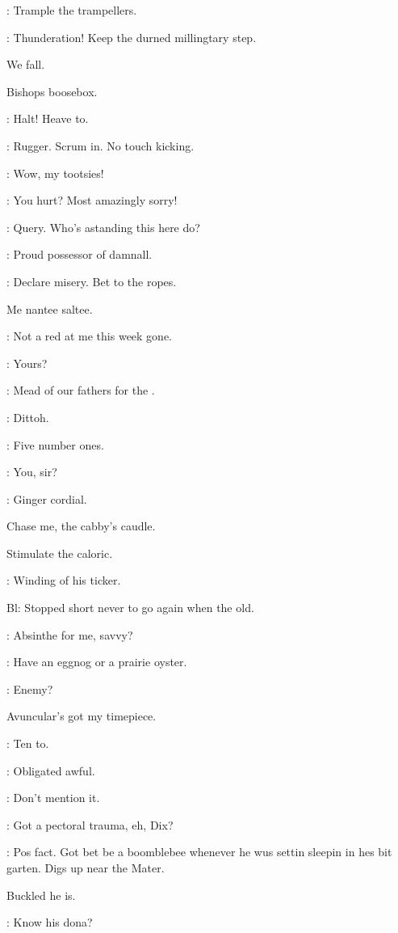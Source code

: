 \crotthers:
Trample the trampellers.

\lenehan:
Thunderation!
Keep the durned millingtary step.

We fall.

Bishops boosebox.

\punch:
Halt!
Heave to.

\dixon:
Rugger.
Scrum in.
No touch kicking.

\lynch:
Wow,
my tootsies!

\dixon:
You hurt?
Most amazingly sorry!


\lenehan:
Query.
Who's astanding this here do?

\madden:
Proud possessor of damnall.

\lynch:
Declare misery.
Bet to the ropes.

Me nantee saltee.

\dixon:
Not a red at me this week gone.

\barman:
Yours?

\stephen:
Mead of our fathers for the .

\bannon:
Dittoh.

\stephen:
Five number ones.

\barman:
You,
sir?

\Bloom:
Ginger cordial.

Chase me,
the cabby's caudle.

Stimulate the caloric.

:
Winding of his ticker.

Bl:
Stopped short never to go again when the old.

\stephen:
Absinthe for me,
savvy?

\mulligan:
 Have an eggnog or a prairie oyster.

\Bloom:
Enemy?

Avuncular's got my timepiece.

\madden:
Ten to.

\Bloom:
Obligated awful.

\madden:
Don't mention it.

\lynch:
Got a pectoral trauma,
eh,
Dix?

\dixon:
Pos fact.
Got bet be a boomblebee whenever he wus
settin sleepin in hes bit garten.
Digs up near the Mater.

Buckled he is.

\mulligan:
Know his dona?

